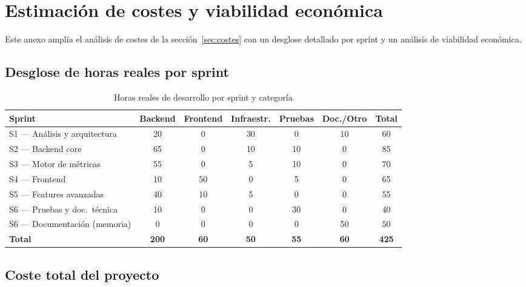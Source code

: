 \chapter{Estimación de costes y viabilidad económica}
\label{anx:costes}

Este anexo amplía el análisis de costes de la sección~\ref{sec:costes} con
un desglose detallado por sprint y un análisis de viabilidad económica.

\section*{Desglose de horas reales por sprint}

\begin{table}[htbp]
  \centering
  \caption{Horas reales de desarrollo por sprint y categoría}
  \small
  \begin{tabularx}{\textwidth}{>{\raggedright\arraybackslash}X c c c c c c}
    \toprule
    \textbf{Sprint} & \textbf{Backend} & \textbf{Frontend} &
      \textbf{Infraestr.} & \textbf{Pruebas} & \textbf{Doc./Otro} & \textbf{Total} \\
    \midrule
    S1 --- Análisis y arquitectura & 20 &  0 & 30 &  0 & 10 &  60 \\
    S2 --- Backend core            & 65 &  0 & 10 & 10 &  0 &  85 \\
    S3 --- Motor de métricas       & 55 &  0 &  5 & 10 &  0 &  70 \\
    S4 --- Frontend                & 10 & 50 &  0 &  5 &  0 &  65 \\
    S5 --- Features avanzadas      & 40 & 10 &  5 &  0 &  0 &  55 \\
    S6 --- Pruebas y doc.\ técnica & 10 &  0 &  0 & 30 &  0 &  40 \\
    S6 --- Documentación (memoria) &  0 &  0 &  0 &  0 & 50 &  50 \\
    \midrule
    \textbf{Total}                 & \textbf{200} & \textbf{60} &
      \textbf{50} & \textbf{55} & \textbf{60} & \textbf{425} \\
    \bottomrule
  \end{tabularx}
\end{table}

\section*{Coste total del proyecto}


